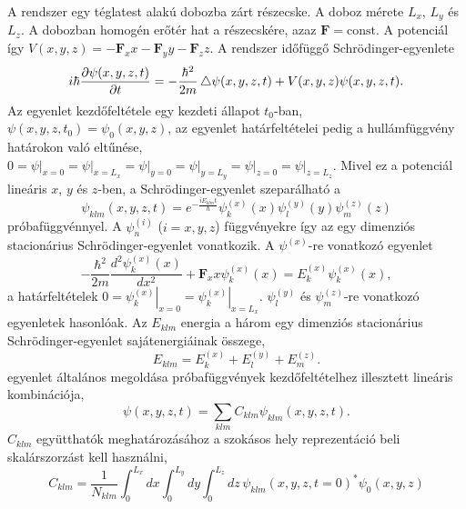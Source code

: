 A rendszer egy téglatest alakú dobozba zárt részecske. A doboz mérete $L_x$, $L_y$ és $L_z$. A dobozban homogén erőtér hat a részecskére, azaz $\boldsymbol{F} = \text{const}$. A potenciál így $V(x, y, z) = -\boldsymbol{F}_xx-\boldsymbol{F}_yy-\boldsymbol{F}_zz$. A rendszer időfüggő Schrödinger-egyenlete
\begin{equation}
	i\hbar\frac{\partial \psi(x, y, z, t)}{\partial t} = -\frac{\hbar^2}{2m} \mathop{}\!\mathbin\bigtriangleup \psi(x, y, z, t) + V(x, y, z)\psi(x, y, z, t).
	\label{3dbox:3dscheq}
\end{equation}
Az egyenlet kezdőfeltétele egy kezdeti állapot $t_0$-ban, $\psi(x, y, z, t_0) = \psi_0(x, y, z)$, az egyenlet határfeltételei pedig a hullámfüggvény határokon való eltűnése, $0=\left.\psi\right|_{x=0}=\left.\psi\right|_{x=L_x}=\left.\psi\right|_{y=0}=\left.\psi\right|_{y=L_y}=\left.\psi\right|_{z=0}=\left.\psi\right|_{z=L_z}$. Mivel ez a potenciál lineáris $x$, $y$ és $z$-ben, a Schrödinger-egyenlet szeparálható a
\begin{equation}
	\psi_{klm}(x, y, z, t) = e^{-\frac{iE_{klm}t}{\hbar}}\psi^{(x)}_k(x)\psi^{(y)}_l(y)\psi^{(z)}_m(z)
	\label{3dox:3dansatz}
\end{equation}
próbafüggvénnyel. A $\psi^{(i)}_n$ ($i=x, y, z$) függvényekre így az egy dimenziós stacionárius Schrödinger-egyenlet vonatkozik. A $\psi^{(x)}$-re vonatkozó egyenlet 
\begin{equation}
	-\frac{\hbar^2}{2m}\frac{d^2\psi^{(x)}_k(x)}{dx^2} + \boldsymbol{F}_xx\psi^{(x)}_k(x) = E^{(x)}_k\psi^{(x)}_k(x),
	\label{3dbox:1deq}
\end{equation}
a határfeltételek $0=\left.\psi^{(x)}_k\right|_{x=0}=\left.\psi^{(x)}_k\right|_{x=L_x}$. $\psi^{(y)}_l$ és $\psi^{(z)}_m$-re vonatkozó egyenletek hasonlóak. Az $E_{klm}$ energia a három egy dimenziós stacionárius Schrödinger-egyenlet sajátenergiáinak összege,
\begin{equation}
	E_{klm} = E^{(x)}_k+E^{(y)}_l+E^{(z)}_m.
\end{equation}
 egyenlet általános megoldása  próbafüggvények kezdőfeltételhez illesztett lineáris kombinációja,
\begin{equation}
	\psi(x,y,z,t) = \sum_{klm}C_{klm}\psi_{klm}(x,y,z,t).
\end{equation}
$C_{klm}$ együtthatók meghatározásához a szokásos hely reprezentáció beli skalárszorzást kell használni,
\begin{equation}
	C_{klm} = \frac{1}{N_{klm}}\int_0^{L_x}dx\int_0^{L_y}dy\int_0^{L_z}dz\,\psi_{klm}(x, y, z, t=0)^*\psi_0(x, y, z)
	\label{3dbox:ceq}
\end{equation}
